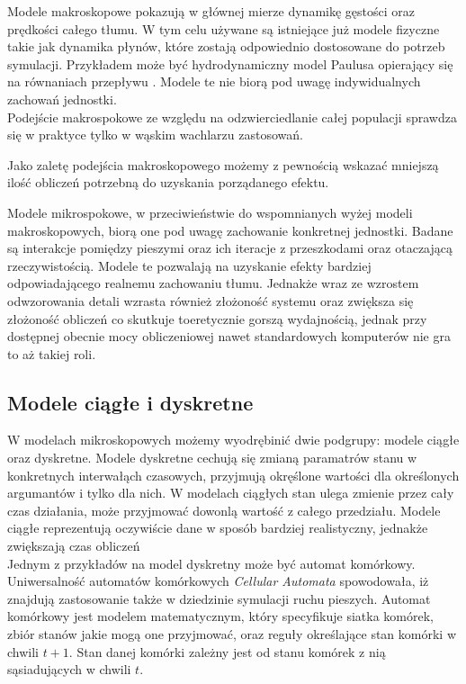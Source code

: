 Modele makroskopowe pokazują w głównej mierze dynamikę gęstości oraz prędkości całego tłumu. W tym celu używane są istniejące już modele fizyczne takie jak dynamika płynów, które zostają odpowiednio dostosowane do potrzeb symulacji. Przykładem może być hydrodynamiczny model Paulusa opierający się na równaniach przepływu \cite{ArchitekturaModelowania}. Modele te nie biorą pod uwagę indywidualnych zachowań jednostki.\\

Podejście makrospokowe ze względu na odzwierciedlanie całej populacji sprawdza się w praktyce tylko w wąskim wachlarzu zastosowań.
 
Jako zaletę podejścia makroskopowego możemy z pewnością wskazać mniejszą ilość obliczeń potrzebną do uzyskania porządanego efektu.

Modele mikrospokowe, w przeciwieństwie do wspomnianych wyżej modeli makroskopowych, biorą one pod uwagę zachowanie konkretnej jednostki. Badane są interakcje pomiędzy pieszymi oraz ich iteracje z przeszkodami oraz otaczającą rzeczywistością. Modele te pozwalają na uzyskanie efekty bardziej odpowiadającego realnemu zachowaniu tłumu. Jednakże wraz ze wzrostem odwzorowania detali wzrasta również złożoność systemu oraz zwiększa się złożoność obliczeń co skutkuje toeretycznie gorszą wydajnością, jednak przy dostępnej obecnie mocy obliczeniowej nawet standardowych komputerów nie gra to aż takiej roli.

\subsection{Modele ciągłe i dyskretne}

W modelach mikroskopowych możemy wyodrębinić dwie podgrupy: modele ciągłe oraz dyskretne. Modele dyskretne cechują się zmianą paramatrów stanu w konkretnych interwałąch czasowych, przyjmują okręślone wartości dla określonych argumantów i tylko dla nich. W modelach ciągłych stan ulega zmienie przez cały czas działania, może przyjmować dowonlą wartość z całego przedziału. Modele ciągłe reprezentują oczywiście dane w sposób bardziej realistyczny, jednakże zwiększają czas obliczeń \\

Jednym z przykładów na model dyskretny może być automat komórkowy. Uniwersalność automatów komórkowych \textit{Cellular Automata} spowodowała, iż znajdują zastosowanie także w dziedzinie symulacji ruchu pieszych. Automat komórkowy jest modelem matematycznym, który specyfikuje siatka komórek, zbiór stanów jakie mogą one przyjmować, oraz reguły określające stan komórki w chwili $t + 1$. Stan danej komórki zależny jest od stanu komórek z nią sąsiadujących w chwili $t$. \\

